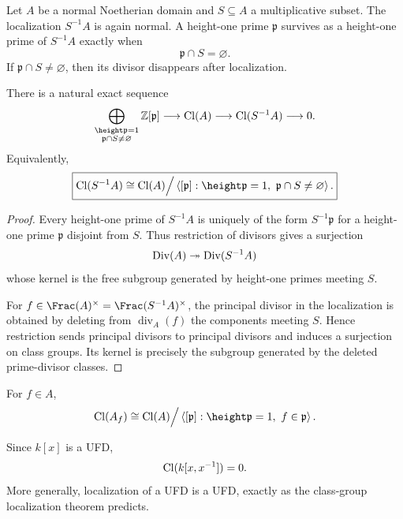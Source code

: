 Let \(A\) be a normal Noetherian domain and \(S\subseteq A\) a multiplicative subset. The localization \(S^{-1}A\) is again normal. A height-one prime \(\mathfrak p\) survives as a height-one prime of \(S^{-1}A\) exactly when
\[
  \mathfrak p\cap S=\varnothing.
\]
If \(\mathfrak p\cap S\neq\varnothing\), then its divisor disappears after localization.

\begin{theorem}\label{thm:vi41-localization}
There is a natural exact sequence
\[
 \bigoplus_{\substack{\height\mathfrak p=1\\ \mathfrak p\cap S\neq\varnothing}}
 \mathbb Z[\mathfrak p]
 \longrightarrow
 \Cl(A)
 \longrightarrow
 \Cl(S^{-1}A)
 \longrightarrow0.
\]
Equivalently,
\[
 \boxed{
 \Cl(S^{-1}A)
 \cong
 \Cl(A)\Big/
 \left\langle
 [\mathfrak p]:
 \height\mathfrak p=1,\
 \mathfrak p\cap S\neq\varnothing
 \right\rangle.
 }
\]
\end{theorem}

\begin{proof}
Every height-one prime of \(S^{-1}A\) is uniquely of the form \(S^{-1}\mathfrak p\) for a height-one prime \(\mathfrak p\) disjoint from \(S\). Thus restriction of divisors gives a surjection
\[
  \operatorname{Div}(A)\twoheadrightarrow\operatorname{Div}(S^{-1}A)
\]
whose kernel is the free subgroup generated by height-one primes meeting \(S\).

For \(f\in\Frac(A)^\times=\Frac(S^{-1}A)^\times\), the principal divisor in the localization is obtained by deleting from \(\operatorname{div}_A(f)\) the components meeting \(S\). Hence restriction sends principal divisors to principal divisors and induces a surjection on class groups. Its kernel is precisely the subgroup generated by the deleted prime-divisor classes.
\end{proof}



\begin{corollary}\label{cor:vi41-principal-localization}
For \(f\in A\),
\[
 \Cl(A_f)
 \cong
 \Cl(A)\Big/
 \left\langle
 [\mathfrak p]:
 \height\mathfrak p=1,\ f\in\mathfrak p
 \right\rangle.
\]
\end{corollary}

\begin{example}\label{ex:vi41-laurent}
Since \(k[x]\) is a UFD,
\[
 \operatorname{Cl}(k[x,x^{-1}])=0.
\]
More generally, localization of a UFD is a UFD, exactly as the class-group localization theorem predicts.
\end{example}

